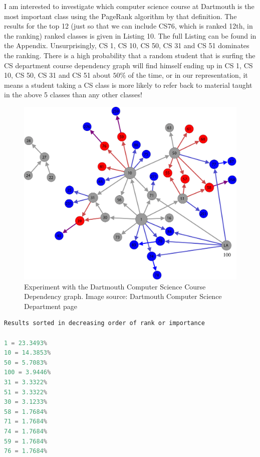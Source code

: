 \documentclass[9.5pt]{extarticle}
\begin{document}
I am interested to investigate which computer science course at Dartmouth is the most important class using the PageRank algorithm by that definition. The results for the top 12 (just so that we can include CS76, which is ranked 12th, in the ranking) ranked classes is given in Listing 10. The full Listing can be found in the Appendix. Unsurprisingly, CS 1, CS 10, CS 50, CS 31 and CS 51 dominates the ranking. There is a high probability that a random student that is surfing the CS department course dependency graph will find himself ending up in CS 1, CS 10, CS 50, CS 31 and CS 51 about $50\%$ of the time, or in our representation, it means a student taking a CS class is more likely to refer back to material taught in the above 5 classes than any other classes! 

\begin{figure}[H]
\centering
\includegraphics[scale=0.17]{course_dependencies.png}
\caption{Experiment with the Dartmouth Computer Science Course Dependency graph. Image source: Dartmouth Computer Science Department page}
\label{Figure 5}
\end{figure}

\begin{lstlisting}[language=java,caption={Truncated Output for PageRank on Course Dependency Graph (Full result is in Appendix)}]
Results sorted in decreasing order of rank or importance

1 = 23.3493%
10 = 14.3853%
50 = 5.7083%
100 = 3.9446%
31 = 3.3322%
51 = 3.3322%
30 = 3.1233%
58 = 1.7684%
71 = 1.7684%
74 = 1.7684%
59 = 1.7684%
76 = 1.7684%

\end{lstlisting}
\end{document}
